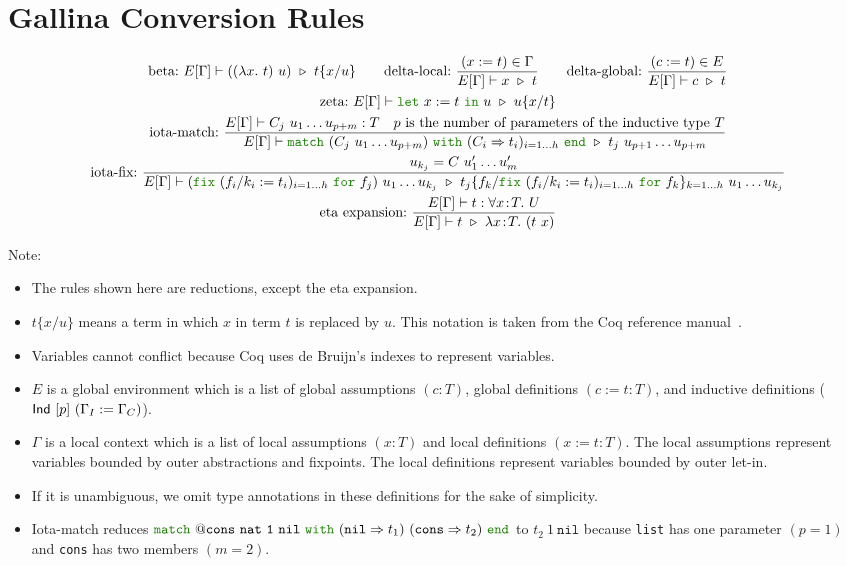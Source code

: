 \documentclass[a4paper,fleqn]{article}
\def\coq{\textrm{Coq}}
\def\gallina{\textrm{Gallina}}
\newcommand{\kwlet}{\mbox{\color{mygreen}\ttfamily let}}
\newcommand{\kwin}{\mbox{\color{mygreen}\ttfamily in}}
\newcommand{\kwmatch}{\mbox{\color{mygreen}\ttfamily match}}
\newcommand{\kwwith}{\mbox{\color{mygreen}\ttfamily with}}
\newcommand{\kwend}{\mbox{\color{mygreen}\ttfamily end}}
\newcommand{\kwfix}{\mbox{\color{mygreen}\ttfamily fix}}
\newcommand{\kwfor}{\mbox{\color{mygreen}\ttfamily for}}
\newcommand{\lam}[2]{\lambda #1.~#2}
\newcommand{\lamT}[3]{\lambda #1\!:\!#2.~#3}
\newcommand{\gassum}[2]{(#1\!:\!#2)}
\newcommand{\glodef}[3]{(#1:=#2\!:\!#3)}
\newcommand{\lassum}[2]{(#1\!:\!#2)}
\newcommand{\ldef}[3]{(#1:=#2\!:\!#3)}
\newcommand{\prodT}[3]{\forall #1\!:\!#2.~#3}
\newcommand{\letin}[3]{\kwlet~#1:=#2~\kwin~#3}
\newcommand{\match}[4]{\kwmatch~#1~\kwwith~(#2 \Rightarrow #3)_{#4}~\kwend}
\newcommand{\fix}[4]{\kwfix~(#1 := #2)_{#3}~\kwfor~#4}
\newcommand{\WT}[4]{\ensuremath{#1[#2] \vdash #3 : #4}}
\newcommand{\WTE}[3]{\WT{E}{#1}{#2}{#3}}
\newcommand{\WTEG}[2]{\WTE{\Gamma}{#1}{#2}}
\newcommand{\subst}[3]{#1\{#2/#3\}}
\begin{document}
\section{\gallina{} Conversion Rules}\label{sec:conversion-rules}

\begin{gather*}
  \text{beta:}~
    E[\Gamma] \vdash ((\lam{x}{t})~u)~\triangleright~\subst{t}{x}{u} \qquad
  \text{delta-local:}~
    \dfrac{(x:=t) \in \Gamma}{E[\Gamma] \vdash x~\triangleright~t} \qquad
  \text{delta-global:}~
    \dfrac{(c:=t) \in E}{E[\Gamma] \vdash c~\triangleright~t} \\
  \text{zeta:}~
    E[\Gamma] \vdash \letin{x}{t}{u}~\triangleright~\subst{u}{x}{t} \\
  \text{iota-match:}~
    \dfrac
    {
      E[\Gamma] \vdash C_j~u_1\ldots u_{p+m} : T \quad
      \text{$p$ is the number of parameters of the inductive type $T$}
    }{
      E[\Gamma] \vdash
      \match{(C_j~u_1\ldots u_{p+m})}{C_i}{t_i}{i=1\dots h}
      ~\triangleright~
      t_j~u_{p+1}\ldots u_{p+m}
    } \\
  \text{iota-fix:}~
    \dfrac{
      u_{k_j} = C~u'_1\ldots u'_m
    }{
      E[\Gamma] \vdash
      (\fix{f_i/k_i}{t_i}{i=1\dots h}{f_j})~u_1 \dots u_{k_j}
      ~\triangleright~
      \subst{t_j}{f_k}{\fix{f_i/k_i}{t_i}{i=1\dots h}{f_k}}_{k=1\dots h} ~u_1 \dots u_{k_j}} \\
  \text{eta expansion:}~
    \dfrac{\WTEG{t}{\prodT{x}{T}{U}}}{E[\Gamma] \vdash t~\triangleright~\lamT{x}{T}{(t~x)}}
\end{gather*}
\raggedright
{\small Note:
\begin{itemize}
  \item The rules shown here are reductions, except the eta expansion.
  \item $\subst{t}{x}{u}$ means a term in which $x$ in term $t$ is replaced by $u$.
    This notation is taken from the Coq reference manual~\cite{coqrefman8.12.0}.
  \item Variables cannot conflict because \coq{} uses de Bruijn's indexes to represent variables.
  \item $E$ is a global environment which is a list of
    global assumptions $\gassum{c}{T}$,
    global definitions $\glodef{c}{t}{T}$, and
    inductive definitions ($\text{\sf Ind}~[p]~(\Gamma_I := \Gamma_C)$).
  \item $\Gamma$ is a local context which is a list of
    local assumptions $\lassum{x}{T}$ and
    local definitions $\ldef{x}{t}{T}$.
    The local assumptions represent variables bounded by outer abstractions and fixpoints.
    The local definitions represent variables bounded by outer let-in.
  \item If it is unambiguous, we omit type annotations in these definitions for the sake of simplicity.
  \item Iota-match reduces $\kwmatch~\mathtt{@cons~nat~1~nil}~\kwwith~(\mathtt{nil} \Rightarrow t_1)~(\mathtt{cons} \Rightarrow t_2)~\kwend$ to $t_2~1~\mathtt{nil}$
    because \lstinline!list! has one parameter $(p=1)$ and \lstinline!cons! has two members $(m=2)$.
\end{itemize}}
\end{document}
